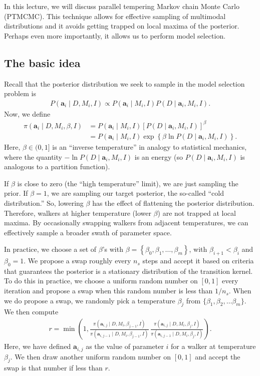 In this lecture, we will discuss parallel tempering Markov chain Monte
Carlo (PTMCMC).  This technique allows for effective sampling of
multimodal distributions and it avoids getting trapped on local maxima
of the posterior. Perhaps even more importantly, it allows us to perform model selection.

\subsection{The basic idea}
Recall that the posterior distribution we seek to sample in the model
selection problem is
\begin{align}
P(\mathbf{a}_i\mid D, M_i, I) \propto P(\mathbf{a}_i \mid M_i, I)
P(D\mid \mathbf{a}_i,M_i, I).
\end{align}
Now, we define
\begin{align}
\pi(\mathbf{a}_i\mid D, M_i, \beta, I) &= P(\mathbf{a}_i \mid M_i, I)
\left[P(D\mid \mathbf{a}_i,M_i, I)\right]^\beta \\
&= P(\mathbf{a}_i \mid M_i, I) \exp\left\{\beta \ln P(D\mid \mathbf{a}_i,M_i, I)\right\}.
\end{align}
Here, $\beta \in (0, 1]$ is an ``inverse temperature'' in analogy to
statistical mechanics, where the quantity $-\ln P(D\mid \mathbf{a}_i,M_i, I)$ is an
energy (so $P(D\mid \mathbf{a}_i,M_i, I)$ is analogous to a partition
function).

If $\beta$ is close to zero (the ``high temperature'' limit), we are
just sampling the prior.  If $\beta = 1$, we are sampling our target
posterior, the so-called ``cold distribution.''  So, lowering $\beta$
has the effect of flattening the posterior distribution.  Therefore,
walkers at higher temperature (lower $\beta$) are not trapped at local
maxima.  By occasionally swapping walkers from adjacent temperatures,
we can effectively sample a broader swath of parameter space.

In practice, we choose a set of $\beta$'s with
$\beta = \left\{\beta_0, \beta_1, \ldots, \beta_m\right\}$, with
$\beta_{i+1} < \beta_i$ and $\beta_0 = 1$. We propose a swap roughly every $n_s$ steps and accept it based on criteria that guarantees the posterior is a stationary distribution of the transition kernel.  To do this in practice, we choose a
uniform random number on $[0,1]$ every iteration and propose a swap
when this random number is less than $1/n_s$.  When we do propose a
swap, we randomly pick a temperature $\beta_j$ from
$\{\beta_1, \beta_2, \ldots \beta_m\}$.  We then compute
\begin{align}
r = \min \left(1,
\frac{\pi(\mathbf{a}_{i,j}\mid D, M_i, \beta_{j-1}, I)}{\pi(\mathbf{a}_{i,j-1}\mid D, M_i, \beta_{j-1}, I)}\,
\frac{\pi(\mathbf{a}_{i,j}\mid D, M_i, \beta_j, I)}{\pi(\mathbf{a}_{i,j-1}\mid D, M_i, \beta_j, I)}\right).
\end{align}
Here, we have defined $\mathbf{a}_{i,j}$ as the value of parameter $i$ for a walker at temperature $\beta_j$.
We then draw another uniform random number on $[0,1]$ and accept the swap
is that number if less than $r$.

